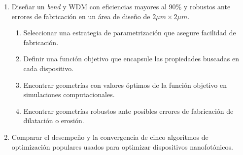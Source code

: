 \begin{enumerate}

  \item Diseñar un \emph{bend} y WDM con eficiencias mayores al 90\% y robustos ante errores de fabricación en un área de diseño de $2 \mu m \times 2 \mu m$. 

  \begin{enumerate}

    \item Seleccionar una estrategia de parametrización que asegure facilidad de fabricación.

    \item Definir una función objetivo que encapsule las propiedades buscadas en cada dispositivo.

    \item Encontrar geometrías con valores óptimos de la función objetivo en simulaciones computacionales.

    \item Encontrar geometrías robustos ante posibles errores de fabricación de dilatación o erosión.

  \end{enumerate}

  \item Comparar el desempeño y la convergencia de cinco algoritmos de optimización populares usados para optimizar dispositivos nanofotónicos.

\end{enumerate}
